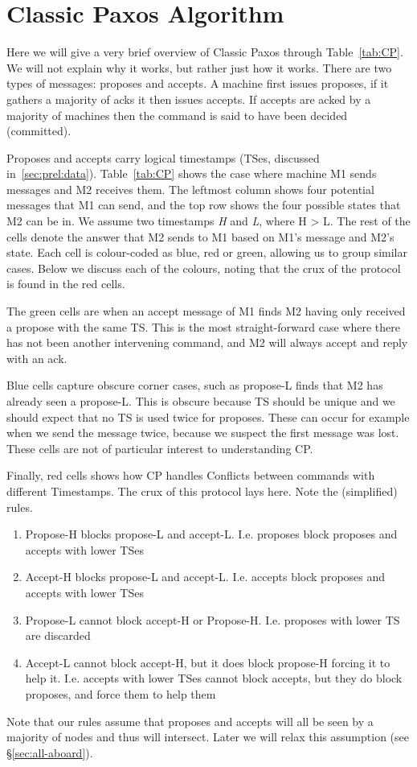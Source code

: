 \section{Classic Paxos Algorithm} \label{sec:cp}

Here we will give a very brief overview of Classic Paxos through Table~\ref{tab:CP}.
We will not explain why it works, but rather just how it works.
There are two types of messages: proposes and accepts. A machine first issues proposes, if it gathers a majority of acks it then issues accepts. If accepts are acked by a majority of machines then the command is said to have been decided (\ie committed).

Proposes and accepts carry logical timestamps (\ie TSes, discussed in~\ref{sec:prel:data}).
Table~\ref{tab:CP} shows the case where machine M1 sends messages and M2 receives them.
The leftmost column shows four potential messages that M1 can send, and the top row shows the four possible states that M2 can be in. We assume two timestamps \emph{H} and \emph{L}, where H > L. 
The rest of the cells denote the answer that M2 sends to M1 based on  M1's message and M2's state. 
Each cell is colour-coded as blue, red or green, allowing us to group similar cases. Below we discuss each of the colours, noting that the crux of the protocol is found in the red cells.

\custvspace
{}
The green cells are when an accept message of M1 finds M2 having only received a propose with the same TS. This is the most straight-forward case where there has not been another intervening command, and M2 will always accept and reply with an ack.

\custvspace
{} Blue cells capture obscure corner cases, such as propose-L finds that M2 has already seen a propose-L. This is obscure because TS should be unique and we should expect that no TS is used twice for proposes. These can occur for example when we send the message twice, because we suspect the first message was lost.
These cells are not of particular interest to understanding CP.

\custvspace
{} Finally, red cells shows how CP handles Conflicts between commands with different Timestamps. The crux of this protocol lays here.
Note the (simplified) rules.

\begin{enumerate}
\item Propose-H blocks propose-L and accept-L. I.e. proposes block proposes and accepts with lower TSes
\item Accept-H blocks propose-L and accept-L. I.e. accepts block proposes and accepts with lower TSes
\item Propose-L cannot block accept-H or Propose-H. I.e. proposes with lower TS are discarded
\item Accept-L cannot block accept-H, but it does block propose-H forcing it to help it. I.e. accepts with lower TSes cannot block accepts, but they do block proposes, and force them to help them
\end{enumerate}


Note that our rules assume that proposes and accepts will all be seen by a majority of nodes and thus will intersect. Later we will relax this assumption (see \S\ref{sec:all-aboard}).
